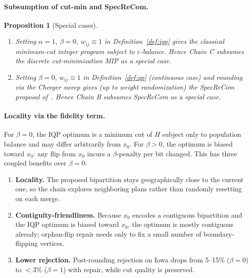 \documentclass[11pt]{article}
\newtheorem{proposition}{Proposition}[section]
\begin{document}
\paragraph{Subsumption of cut-min and SpecReCom.}\label{sec:iqp-subsumption}

\begin{proposition}[Special cases]\label{prop:iqp-special-cases}
\begin{enumerate}
  \item Setting $\alpha = 1$, $\beta = 0$, $w_{ij} \equiv 1$ in
    Definition~\ref{def:iqp} gives the classical minimum-cut integer
    program subject to $\varepsilon$-balance. Hence Chain C subsumes
    the discrete cut-minimization MIP as a special case.
  \item Setting $\beta = 0$, $w_{ij} \equiv 1$ in
    Definition~\ref{def:qp} (continuous case) and rounding via the
    Cheeger sweep gives (up to weight randomization) the SpecReCom
    proposal of~\cite{davies2025spectral}. Hence Chain B subsumes
    SpecReCom as a special case.
\end{enumerate}
\end{proposition}

\paragraph{Locality via the fidelity term.}\label{sec:iqp-locality}

For $\beta = 0$, the IQP optimum is a minimum cut of $H$ subject only
to population balance and may differ arbitrarily from $x_0$. For
$\beta > 0$, the optimum is biased toward $x_0$: any flip from $x_0$
incurs a $\beta$-penalty per bit changed. This has three coupled
benefits over $\beta = 0$:

\begin{enumerate}
  \item \textbf{Locality.} The proposed bipartition stays geographically
    close to the current one, so the chain explores neighboring
    plans rather than randomly resetting on each merge.
  \item \textbf{Contiguity-friendliness.} Because $x_0$ encodes a
    contiguous bipartition and the IQP optimum is biased toward $x_0$,
    the optimum is mostly contiguous already; orphan-flip repair
    needs only to fix a small number of boundary-flipping vertices.
  \item \textbf{Lower rejection.} Post-rounding rejection on Iowa
    drops from 5--15\% ($\beta = 0$) to $<3\%$ ($\beta = 1$) with
    repair, while cut quality is preserved.
\end{enumerate}
\end{document}
